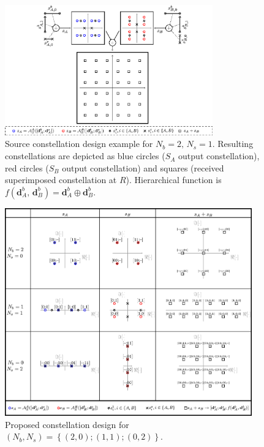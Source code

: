 \documentclass{article}
\begin{document}
\begin{figure}
\centering{}
\includegraphics[width=0.8\textwidth]{fig/d2_1}
\caption{Source constellation design example for $N_{b}=2,\,N_{s}=1$. Resulting
constellations are depicted as blue circles ($S_{A}$ output constellation),
red circles ($S_{B}$ output constellation) and squares (received
superimposed constellation at $R$). Hierarchical function is $f\left(\mathbf{d}_{A}^{b},\,\mathbf{d}_{B}^{b}\right)=\mathbf{d}_{A}^{b}\oplus\mathbf{d}_{B}^{b}$.\label{fig:CTUpp_ConstellationDesignExample} }
\end{figure}


\begin{figure}
\begin{centering}
\includegraphics[width=0.95\textwidth]{fig/const_all_2}
\par\end{centering}

\caption{Proposed constellation design for $\left(N_{b},N_{s}\right)=\left\{ \left(2,0\right);\left(1,1\right);\left(0,2\right)\right\} $.\label{fig:CTUpp_ConstellationDesign_NbNs2} }
\end{figure}
\end{document}
